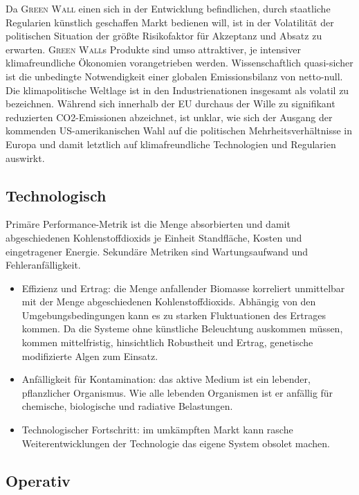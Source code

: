 Da \textsc{Green Wall} einen sich in der Entwicklung befindlichen, durch staatliche Regularien künstlich geschaffen Markt bedienen will, ist in der Volatilität der politischen Situation der größte Risikofaktor für Akzeptanz und Absatz zu erwarten.
\textsc{Green Wall}s Produkte sind umso attraktiver, je intensiver klimafreundliche Ökonomien vorangetrieben werden.
Wissenschaftlich quasi-sicher ist die unbedingte Notwendigkeit einer globalen Emissionsbilanz von netto-null.
Die klimapolitische Weltlage ist in den Industrienationen insgesamt als volatil zu bezeichnen.
Während sich innerhalb der EU durchaus der Wille zu signifikant reduzierten CO2-Emissionen abzeichnet, ist unklar, wie sich der Ausgang der kommenden US-amerikanischen Wahl auf die politischen Mehrheitsverhältnisse in Europa und damit letztlich auf klimafreundliche Technologien und Regularien auswirkt.

\subsection{Technologisch}

Primäre Performance-Metrik ist die Menge absorbierten und damit abgeschiedenen Kohlenstoffdioxids je Einheit Standfläche, Kosten und eingetragener Energie.
Sekundäre Metriken sind Wartungsaufwand und Fehleranfälligkeit.
\begin{itemize}
    \item Effizienz und Ertrag: die Menge anfallender Biomasse korreliert unmittelbar mit der Menge abgeschiedenen Kohlenstoffdioxids.
          Abhängig von den Umgebungsbedingungen kann es zu starken Fluktuationen des Ertrages kommen.
          Da die Systeme ohne künstliche Beleuchtung auskommen müssen, kommen mittelfristig, hinsichtlich Robustheit und Ertrag, genetische modifizierte Algen zum Einsatz.
    \item Anfälligkeit für Kontamination: das aktive Medium ist ein lebender, pflanzlicher Organismus. Wie alle lebenden Organismen ist er anfällig für chemische, biologische und radiative Belastungen.
    \item Technologischer Fortschritt: im umkämpften Markt kann rasche Weiterentwicklungen der Technologie das eigene System obsolet machen.
\end{itemize}

\subsection{Operativ}

